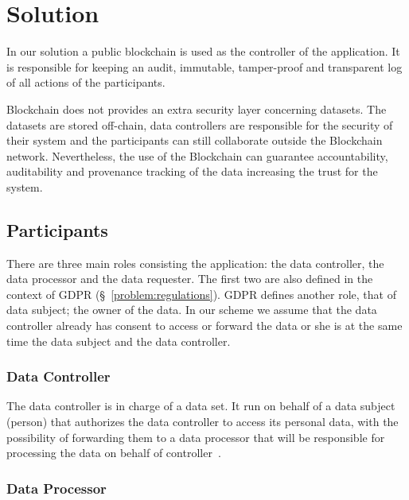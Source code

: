 \chapter{Solution}
\label{solution}

In our solution a public blockchain is used as the controller of the application. It is responsible for keeping an
audit, immutable, tamper-proof and transparent log of all actions of the participants.

Blockchain does not provides an extra security layer concerning datasets. The datasets are stored off-chain, data controllers are responsible for the security of their system and the participants can still collaborate outside the Blockchain network. Nevertheless, the use of the Blockchain can guarantee accountability, auditability and provenance tracking of the data increasing the trust for the system.

\section{Participants}
\label{solution:entities}

There are three main roles consisting the application: the data controller, the data processor
and the data requester. The first two are also defined in the context of GDPR (§~\ref{problem:regulations}).
GDPR defines another role, that of data subject; the owner of the data.
In our scheme we assume that the data controller already has consent to access or forward the data or she is at the same time the data subject and the data controller.

\subsection{Data Controller}
\label{solution:entities:data_controller}

The data controller is in charge of a data set. It run on behalf of a data subject (person)
that authorizes the data controller to access its personal data, with the possibility of forwarding
them to a data processor that will be responsible for processing the data on behalf of controller~\cite{DBLP:journals/corr/NeisseSF17}.

\subsection{Data Processor}
\label{solution:entities:data_processor}

